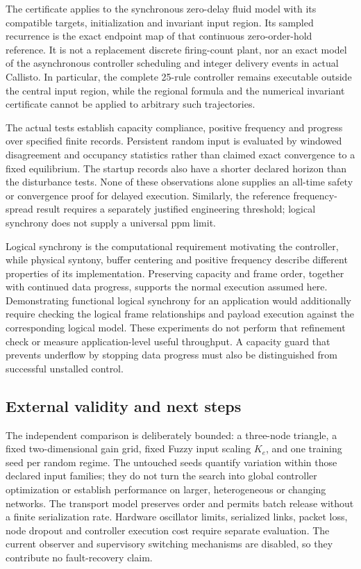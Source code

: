 The certificate applies to the synchronous zero-delay fluid model with
its compatible targets, initialization and invariant input region.
Its sampled recurrence is the exact endpoint map of that continuous
zero-order-hold reference. It is not a replacement discrete firing-count
plant, nor an exact model of the asynchronous controller scheduling
and integer delivery events in actual Callisto. In particular, the
complete 25-rule controller remains executable outside the central
input region, while the regional formula and the numerical invariant
certificate cannot be applied to arbitrary such trajectories.

The actual tests establish capacity compliance, positive frequency and
progress over specified finite records. Persistent random input is
evaluated by windowed disagreement and occupancy statistics rather
than claimed exact convergence to a fixed equilibrium. The startup
records also have a shorter declared horizon than the disturbance
tests. None of these observations alone supplies an all-time safety
or convergence proof for delayed execution. Similarly, the reference
frequency-spread result requires a separately justified engineering
threshold; logical synchrony does not supply a universal ppm limit.

Logical synchrony is the computational requirement motivating the
controller, while physical syntony, buffer centering and positive
frequency describe different properties of its implementation.
Preserving capacity and frame order, together with continued data
progress, supports the normal execution assumed here. Demonstrating
functional logical synchrony for an application would additionally
require checking the logical frame relationships and payload execution
against the corresponding logical model. These experiments do not
perform that refinement check or measure application-level useful
throughput. A capacity guard that prevents underflow by stopping data
progress must also be distinguished from successful unstalled control.

\subsection{External validity and next steps}
\label{detail:subsec:discussion_future}

The independent comparison is deliberately bounded: a three-node
triangle, a fixed two-dimensional gain grid, fixed Fuzzy input scaling
$K_e$, and one training seed per random regime. The untouched seeds
quantify variation within those declared input families; they do not
turn the search into global controller optimization or establish
performance on larger, heterogeneous or changing networks. The
transport model preserves order and permits batch release without a
finite serialization rate. Hardware oscillator limits, serialized
links, packet loss, node dropout and controller execution cost require
separate evaluation. The current observer and supervisory switching
mechanisms are disabled, so they contribute no fault-recovery claim.

